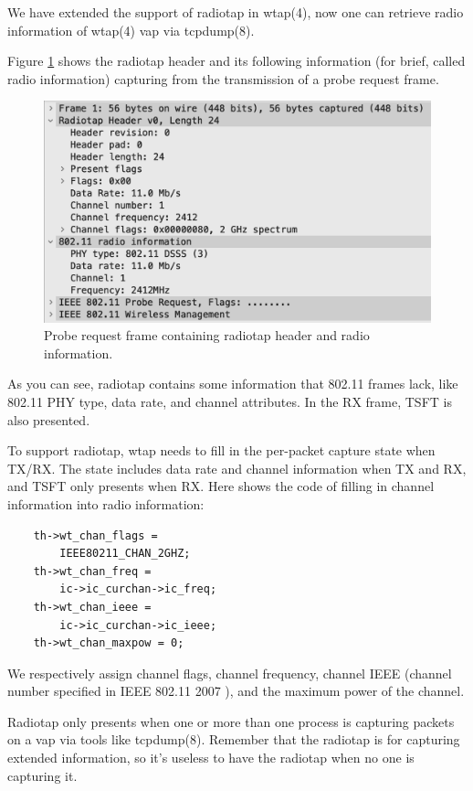 \documentclass[conference]{IEEEtran}
\begin{document}
We have extended the support of radiotap in wtap(4), now one can retrieve radio information of wtap(4) vap via tcpdump(8).

Figure \ref{fig:radiotap} shows the radiotap header and its following information (for brief, called radio information) capturing from the transmission of a probe request frame.

\begin{figure}[H]
\includegraphics[scale=0.17]{radiotap-tx-modified.png}
\caption{Probe request frame containing radiotap header and radio information.}
\label{fig:radiotap}
\end{figure}

As you can see, radiotap contains some information that 802.11 frames lack, like 802.11 PHY type, data rate, and channel attributes. In the RX frame, TSFT is also presented.

To support radiotap, wtap needs to fill in the per-packet capture state when TX/RX. The state includes data rate and channel information when TX and RX, and TSFT only presents when RX. Here shows the code of filling in channel information into radio information:

\begin{lstlisting}
    th->wt_chan_flags = 
        IEEE80211_CHAN_2GHZ;
    th->wt_chan_freq = 
        ic->ic_curchan->ic_freq;
    th->wt_chan_ieee = 
        ic->ic_curchan->ic_ieee;
    th->wt_chan_maxpow = 0;
\end{lstlisting}

We respectively assign channel flags, channel frequency, channel IEEE (channel number specified in IEEE 802.11 2007 \cite{IEEE80211_2007}), and the maximum power of the channel.

Radiotap only presents when one or more than one process is capturing packets on a vap via tools like tcpdump(8). Remember that the radiotap is for capturing extended information, so it's useless to have the radiotap when no one is capturing it. 
\end{document}
